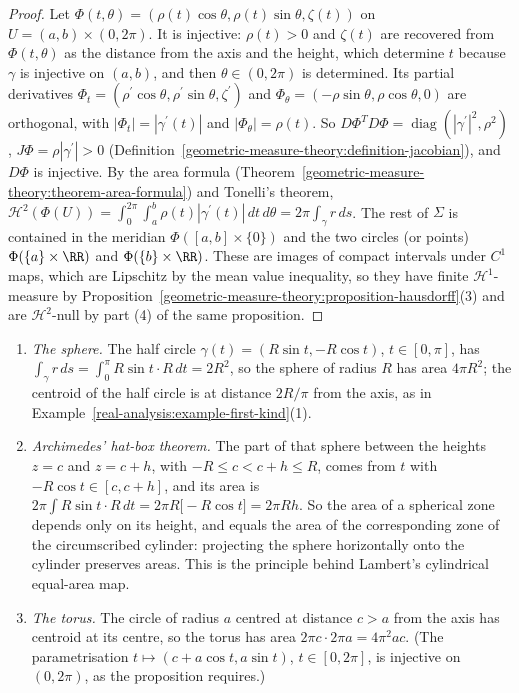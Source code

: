 \begin{proof}
Let $\Phi(t, \theta) = (\rho(t)\cos\theta, \rho(t)\sin\theta, \zeta(t))$ on $U = (a, b) \times (0, 2\pi)$. It is injective: $\rho(t) > 0$ and $\zeta(t)$ are recovered from $\Phi(t, \theta)$ as the distance from the axis and
the height, which determine $t$ because $\gamma$ is injective on $(a, b)$, and then $\theta \in (0, 2\pi)$ is determined. Its partial derivatives
$\Phi_t = (\rho^{\prime}\cos\theta, \rho^{\prime}\sin\theta, \zeta^{\prime})$ and $\Phi_\theta = (-\rho\sin\theta, \rho\cos\theta, 0)$ are orthogonal, with $|\Phi_t| = |\gamma^{\prime}(t)|$ and $|\Phi_\theta| = \rho(t)$. So
$D\Phi^TD\Phi = \operatorname{diag}(|\gamma^{\prime}|^2, \rho^2)$, $J\Phi = \rho|\gamma^{\prime}| > 0$ (Definition~\ref{geometric-measure-theory:definition-jacobian}), and $D\Phi$ is injective. By the area formula
(Theorem~\ref{geometric-measure-theory:theorem-area-formula}) and Tonelli's theorem, $\mathcal{H}^2(\Phi(U)) = \int_0^{2\pi}\int_a^b\rho(t)|\gamma^{\prime}(t)|\,dt\,d\theta = 2\pi\int_\gamma r\,ds$. The rest of $\Sigma$ is contained in the
meridian $\Phi([a, b] \times \{0\})$ and the two circles (or points) $\Phi(\{a\} \times \RR)$ and $\Phi(\{b\} \times \RR)$. These are images of compact intervals under $C^1$ maps, which are Lipschitz by the mean value
inequality, so they have finite $\mathcal{H}^1$-measure by Proposition~\ref{geometric-measure-theory:proposition-hausdorff}(3) and are $\mathcal{H}^2$-null by part (4) of the same proposition.
\end{proof}

\begin{example}\label{geometric-measure-theory:example-pappus-area}
\begin{enumerate}
\item \emph{The sphere.} The half circle $\gamma(t) = (R\sin t, -R\cos t)$, $t \in [0, \pi]$, has $\int_\gamma r\,ds = \int_0^\pi R\sin t \cdot R\,dt = 2R^2$, so the sphere of radius $R$ has area $4\pi R^2$; the centroid of the half
circle is at distance $2R/\pi$ from the axis, as in Example~\ref{real-analysis:example-first-kind}(1).
\item \emph{Archimedes' hat-box theorem.} The part of that sphere between the heights $z = c$ and $z = c + h$, with $-R \leq c < c + h \leq R$, comes from $t$ with $-R\cos t \in [c, c + h]$, and its area is
$2\pi\int R\sin t \cdot R\,dt = 2\pi R\bigl[-R\cos t\bigr] = 2\pi Rh$. So the area of a spherical zone depends only on its height, and equals the area of the corresponding zone of the circumscribed cylinder: projecting
the sphere horizontally onto the cylinder preserves areas. This is the principle behind Lambert's cylindrical equal-area map.
\item \emph{The torus.} The circle of radius $a$ centred at distance $c > a$ from the axis has centroid at its centre, so the torus has area $2\pi c \cdot 2\pi a = 4\pi^2ac$. (The parametrisation
$t \mapsto (c + a\cos t, a\sin t)$, $t \in [0, 2\pi]$, is injective on $(0, 2\pi)$, as the proposition requires.)
\end{enumerate}
\end{example}

